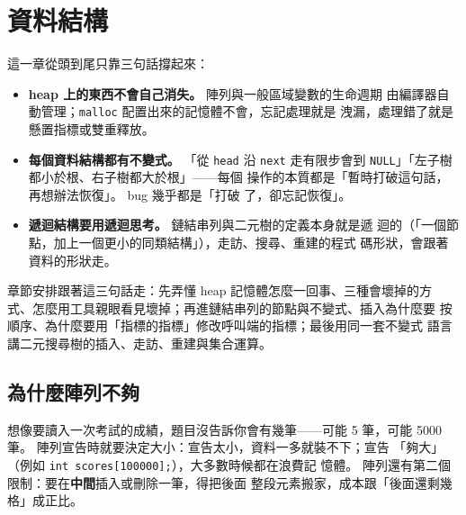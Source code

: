 \chapter{資料結構}
\label{ch:datastructure}

這一章從頭到尾只靠三句話撐起來：

\begin{itemize}
\item \textbf{heap 上的東西不會自己消失。} 陣列與一般區域變數的生命週期
由編譯器自動管理；\texttt{malloc} 配置出來的記憶體不會，忘記處理就是
洩漏，處理錯了就是懸置指標或雙重釋放。
\item \textbf{每個資料結構都有不變式。} 「從 \texttt{head} 沿 \texttt{next}
走有限步會到 \texttt{NULL}」「左子樹都小於根、右子樹都大於根」——每個
操作的本質都是「暫時打破這句話，再想辦法恢復」。 bug 幾乎都是「打破
了，卻忘記恢復」。
\item \textbf{遞迴結構要用遞迴思考。} 鏈結串列與二元樹的定義本身就是遞
迴的（「一個節點，加上一個更小的同類結構」），走訪、搜尋、重建的程式
碼形狀，會跟著資料的形狀走。
\end{itemize}

章節安排跟著這三句話走：先弄懂 heap 記憶體怎麼一回事、三種會壞掉的方
式、怎麼用工具親眼看見壞掉；再進鏈結串列的節點與不變式、插入為什麼要
按順序、為什麼要用「指標的指標」修改呼叫端的指標；最後用同一套不變式
語言講二元搜尋樹的插入、走訪、重建與集合運算。

\section{為什麼陣列不夠}
\label{sec:ds-why-not-array}

想像要讀入一次考試的成績，題目沒告訴你會有幾筆——可能 5 筆，可能
5000 筆。 陣列宣告時就要決定大小：宣告太小，資料一多就裝不下；宣告
「夠大」（例如 \texttt{int scores[100000];}），大多數時候都在浪費記
憶體。 陣列還有第二個限制：要在\textbf{中間}插入或刪除一筆，得把後面
整段元素搬家，成本跟「後面還剩幾格」成正比。

\begin{center}
\label{fig:ds-array-vs-linked}
\end{center}

